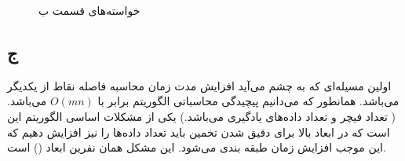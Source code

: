\documentclass[12pt,onecolumn,a4paper]{article}
\begin{document}
\begin{figure}[h!]
    \centering
    \caption{خواسته‌های قسمت ب}
    \label{fig:10}
\end{figure}

\subsection*{ج}
اولین مسيله‌ای که به چشم می‌آید افزایش مدت زمان محاسبه فاصله نقاط از یکدیگر می‌باشد. همانطور که می‌دانیم پیچیدگی محاسباتی الگوریتم  برابر با $O(mn)$ می‌باشد. ( تعداد فیچر و  تعداد داده‌های یادگیری می‌باشد.) یکی از مشکلات اساسی الگوریتم  این است که در ابعاد بالا برای دقیق شدن تخمین باید تعداد داده‌ها را نیز افزایش دهیم که این موجب افزایش زمان طبقه بندی می‌شود. این مشکل همان نفرین ابعاد () است.
\end{document}
